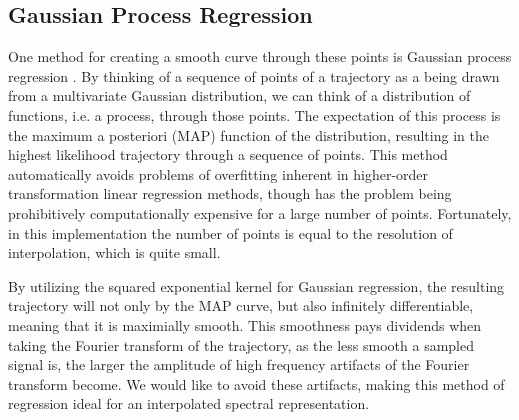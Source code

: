 \subsection{Gaussian Process Regression}
\label{subsection:gaussian-process-regression}

One method for creating a smooth curve through these points is Gaussian process regression \citep{williams1996gaussian}.  By thinking of a sequence of points of a trajectory as a being drawn from a multivariate Gaussian distribution, we can think of a distribution of functions, i.e. a process, through those points.  The expectation of this process is the maximum a posteriori (MAP) function of the distribution, resulting in the highest likelihood trajectory through a sequence of points.  This method automatically avoids problems of overfitting inherent in higher-order transformation linear regression methods, though has the problem being prohibitively computationally expensive for a large number of points.  Fortunately, in this implementation the number of points is equal to the resolution of interpolation, which is quite small.

By utilizing the squared exponential kernel for Gaussian regression, the resulting trajectory will not only by the MAP curve, but also infinitely differentiable, meaning that it is maximially smooth.  This smoothness pays dividends when taking the Fourier transform of the trajectory, as the less smooth a sampled signal is, the larger the amplitude of high frequency artifacts of the Fourier transform become. We would like to avoid these artifacts, making this method of regression ideal for an interpolated spectral representation.



